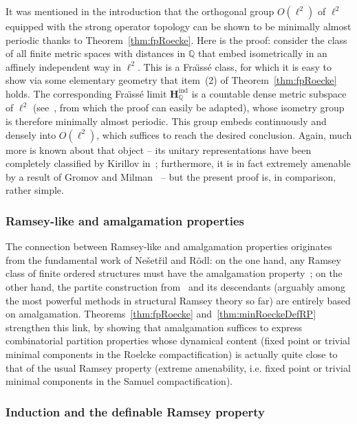 \documentclass[11pt]{article}
\theoremstyle{definition}
\numberwithin{equation}{section}
\numberwithin{figure}{section}
\numberwithin{table}{section}
\newcommand{\Q}{\mathbb{Q}}
\newcommand*{\mH}{\mathbf{H}}
\begin{document}
It was mentioned in the introduction that the orthogonal group $O(\ell^{2})$ of $\ell^{2}$ equipped with the strong operator topology can be shown to be minimally almost periodic thanks to Theorem~\ref{thm:fpRoecke}. Here is the proof: consider the class of all finite metric spaces with distances in $\Q$ that embed isometrically in an affinely independent way in $\ell^{2}$. This is a Fra\"{\i}ss\'e class, for which it is easy to show via some elementary geometry that item~(2) of Theorem~\ref{thm:fpRoecke} holds. The corresponding Fra\"{\i}ss\'e limit $\mH_{\Q}^{\mathrm{ind}}$ is a countable dense metric subspace of $\ell^{2}$ (see~\cite[Chapter~1, Section~4.3]{NVT1}, from which the proof can easily be adapted), whose isometry group is therefore minimally almost periodic. This group embeds continuously and densely into $O(\ell^{2})$, which suffices to reach the desired conclusion. Again, much more is known about that object -- its unitary representations have been completely classified by Kirillov in~\cite{Ki}; furthermore, it is in fact extremely amenable by a result of Gromov and Milman~\cite{GM} -- but the present proof is, in comparison, rather simple.


\subsubsection{Ramsey-like and amalgamation properties}

The connection between Ramsey-like and amalgamation properties originates from the fundamental work of Ne\v set\v ril and R\"odl: on the one hand, any Ramsey class of finite ordered structures must have the amalgamation property~\cite{Ne1}; on the other hand, the partite construction from~\cite{NR2} and its descendants (arguably among the most powerful methods in structural Ramsey theory so far) are entirely based on amalgamation. Theorems~\ref{thm:fpRoecke} and~\ref{thm:minRoeckeDefRP} strengthen this link, by showing that amalgamation suffices to express combinatorial partition properties whose dynamical content (fixed point or trivial minimal components in the Roelcke compactification) is actually quite close to that of the usual Ramsey property (extreme amenability, i.e. fixed point or trivial minimal components in the Samuel compactification).

\subsubsection{Induction and the definable Ramsey property}
\end{document}
